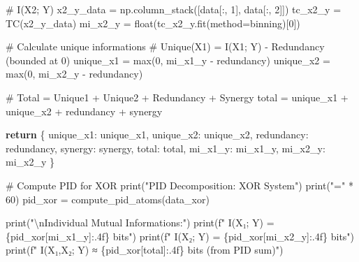 \documentclass[
  11pt,
  letterpaper,
  oneside,
  openany]{book}
\newenvironment{Shaded}{\begin{snugshade}}{\end{snugshade}}
\newcommand{\BuiltInTok}[1]{\textcolor[rgb]{0.00,0.23,0.31}{#1}}
\newcommand{\CharTok}[1]{\textcolor[rgb]{0.13,0.47,0.30}{#1}}
\newcommand{\CommentTok}[1]{\textcolor[rgb]{0.37,0.37,0.37}{#1}}
\newcommand{\ControlFlowTok}[1]{\textcolor[rgb]{0.00,0.23,0.31}{\textbf{#1}}}
\newcommand{\DecValTok}[1]{\textcolor[rgb]{0.68,0.00,0.00}{#1}}
\newcommand{\NormalTok}[1]{\textcolor[rgb]{0.00,0.23,0.31}{#1}}
\newcommand{\OperatorTok}[1]{\textcolor[rgb]{0.37,0.37,0.37}{#1}}
\newcommand{\SpecialCharTok}[1]{\textcolor[rgb]{0.37,0.37,0.37}{#1}}
\newcommand{\SpecialStringTok}[1]{\textcolor[rgb]{0.13,0.47,0.30}{#1}}
\newcommand{\StringTok}[1]{\textcolor[rgb]{0.13,0.47,0.30}{#1}}
\begin{document}
\begin{Shaded}
\begin{Highlighting}[]
    \CommentTok{\# I(X2; Y)}
\NormalTok{    x2\_y\_data }\OperatorTok{=}\NormalTok{ np.column\_stack([data[:, }\DecValTok{1}\NormalTok{], data[:, }\DecValTok{2}\NormalTok{]])}
\NormalTok{    tc\_x2\_y }\OperatorTok{=}\NormalTok{ TC(x2\_y\_data)}
\NormalTok{    mi\_x2\_y }\OperatorTok{=} \BuiltInTok{float}\NormalTok{(tc\_x2\_y.fit(method}\OperatorTok{=}\StringTok{\textquotesingle{}binning\textquotesingle{}}\NormalTok{)[}\DecValTok{0}\NormalTok{])}
    
    \CommentTok{\# Calculate unique informations}
    \CommentTok{\# Unique(X1) = I(X1; Y) {-} Redundancy (bounded at 0)}
\NormalTok{    unique\_x1 }\OperatorTok{=} \BuiltInTok{max}\NormalTok{(}\DecValTok{0}\NormalTok{, mi\_x1\_y }\OperatorTok{{-}}\NormalTok{ redundancy)}
\NormalTok{    unique\_x2 }\OperatorTok{=} \BuiltInTok{max}\NormalTok{(}\DecValTok{0}\NormalTok{, mi\_x2\_y }\OperatorTok{{-}}\NormalTok{ redundancy)}
    
    \CommentTok{\# Total = Unique1 + Unique2 + Redundancy + Synergy}
\NormalTok{    total }\OperatorTok{=}\NormalTok{ unique\_x1 }\OperatorTok{+}\NormalTok{ unique\_x2 }\OperatorTok{+}\NormalTok{ redundancy }\OperatorTok{+}\NormalTok{ synergy}
    
    \ControlFlowTok{return}\NormalTok{ \{}
        \StringTok{\textquotesingle{}unique\_x1\textquotesingle{}}\NormalTok{: unique\_x1,}
        \StringTok{\textquotesingle{}unique\_x2\textquotesingle{}}\NormalTok{: unique\_x2,}
        \StringTok{\textquotesingle{}redundancy\textquotesingle{}}\NormalTok{: redundancy,}
        \StringTok{\textquotesingle{}synergy\textquotesingle{}}\NormalTok{: synergy,}
        \StringTok{\textquotesingle{}total\textquotesingle{}}\NormalTok{: total,}
        \StringTok{\textquotesingle{}mi\_x1\_y\textquotesingle{}}\NormalTok{: mi\_x1\_y,}
        \StringTok{\textquotesingle{}mi\_x2\_y\textquotesingle{}}\NormalTok{: mi\_x2\_y}
\NormalTok{    \}}

\CommentTok{\# Compute PID for XOR}
\BuiltInTok{print}\NormalTok{(}\StringTok{"PID Decomposition: XOR System"}\NormalTok{)}
\BuiltInTok{print}\NormalTok{(}\StringTok{"="} \OperatorTok{*} \DecValTok{60}\NormalTok{)}
\NormalTok{pid\_xor }\OperatorTok{=}\NormalTok{ compute\_pid\_atoms(data\_xor)}

\BuiltInTok{print}\NormalTok{(}\StringTok{"}\CharTok{\textbackslash{}n}\StringTok{Individual Mutual Informations:"}\NormalTok{)}
\BuiltInTok{print}\NormalTok{(}\SpecialStringTok{f"  I(X₁; Y) = }\SpecialCharTok{\{}\NormalTok{pid\_xor[}\StringTok{\textquotesingle{}mi\_x1\_y\textquotesingle{}}\NormalTok{]}\SpecialCharTok{:.4f\}}\SpecialStringTok{ bits"}\NormalTok{)}
\BuiltInTok{print}\NormalTok{(}\SpecialStringTok{f"  I(X₂; Y) = }\SpecialCharTok{\{}\NormalTok{pid\_xor[}\StringTok{\textquotesingle{}mi\_x2\_y\textquotesingle{}}\NormalTok{]}\SpecialCharTok{:.4f\}}\SpecialStringTok{ bits"}\NormalTok{)}
\BuiltInTok{print}\NormalTok{(}\SpecialStringTok{f"  I(X₁,X₂; Y) ≈ }\SpecialCharTok{\{}\NormalTok{pid\_xor[}\StringTok{\textquotesingle{}total\textquotesingle{}}\NormalTok{]}\SpecialCharTok{:.4f\}}\SpecialStringTok{ bits (from PID sum)"}\NormalTok{)}


\end{Highlighting}
\end{Shaded}
\end{document}
